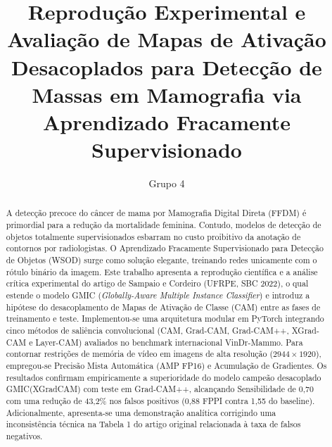 \documentclass[12pt]{article}
\title{Reprodução Experimental e Avaliação de Mapas de Ativação Desacoplados para Detecção de Massas em Mamografia via Aprendizado Fracamente Supervisionado}
\author{Grupo 4\inst{1}}
\begin{document}
\maketitle

\begin{abstract}
A detecção precoce do câncer de mama por Mamografia Digital Direta (FFDM) é primordial para a redução da mortalidade feminina. Contudo, modelos de detecção de objetos totalmente supervisionados esbarram no custo proibitivo da anotação de contornos por radiologistas. O Aprendizado Fracamente Supervisionado para Detecção de Objetos (WSOD) surge como solução elegante, treinando redes unicamente com o rótulo binário da imagem. Este trabalho apresenta a reprodução científica e a análise crítica experimental do artigo de Sampaio e Cordeiro (UFRPE, SBC 2022), o qual estende o modelo GMIC (\textit{Globally-Aware Multiple Instance Classifier}) e introduz a hipótese do desacoplamento de Mapas de Ativação de Classe (CAM) entre as fases de treinamento e teste. Implementou-se uma arquitetura modular em PyTorch integrando cinco métodos de saliência convolucional (CAM, Grad-CAM, Grad-CAM++, XGrad-CAM e Layer-CAM) avaliados no benchmark internacional VinDr-Mammo. Para contornar restrições de memória de vídeo em imagens de alta resolução ($2944 \times 1920$), empregou-se Precisão Mista Automática (AMP FP16) e Acumulação de Gradientes. Os resultados confirmam empiricamente a superioridade do modelo campeão desacoplado GMIC(XGradCAM) com teste em Grad-CAM++, alcançando Sensibilidade de 0,70 com uma redução de 43,2\% nos falsos positivos (0,88 FPPI contra 1,55 do baseline). Adicionalmente, apresenta-se uma demonstração analítica corrigindo uma inconsistência técnica na Tabela 1 do artigo original relacionada à taxa de falsos negativos.
\end{abstract}
\end{document}
